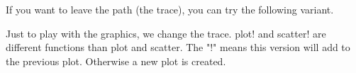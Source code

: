If you want to leave the path (the trace), you can try the following
variant.

\begin{Shaded}
\begin{Highlighting}[]
\NormalTok{scatter([x[}\NormalTok{]]}\OperatorTok{,}\NormalTok{[y[}\NormalTok{]]}\OperatorTok{,}\OperatorTok{=}\NormalTok{ (}\OperatorTok{,}\NormalTok{)}\OperatorTok{,}\OperatorTok{=}\NormalTok{ (}\OperatorTok{,}\NormalTok{)}\OperatorTok{,}\OperatorTok{=} \OperatorTok{:}\OperatorTok{,}\OperatorTok{=} \OperatorTok{,}\OperatorTok{=} \OperatorTok{:}
\OperatorTok{=} \OperatorTok{:}
\NormalTok{)}
\OperatorTok{=}\NormalTok{ x[}\OperatorTok{:}\NormalTok{i]}
\OperatorTok{=}\NormalTok{ y[}\OperatorTok{:}\NormalTok{i]}
\OperatorTok{=}\OperatorTok{,}\OperatorTok{,}\OperatorTok{=}\NormalTok{ (}\OperatorTok{,}\NormalTok{)}\OperatorTok{,}\OperatorTok{=}\NormalTok{ (}\OperatorTok{,}\NormalTok{)}\OperatorTok{,}\OperatorTok{=} \OperatorTok{:}\OperatorTok{,}\OperatorTok{=} \OperatorTok{,}\OperatorTok{=} \OperatorTok{:}
\NormalTok{)}
\end{Highlighting}
\end{Shaded}

Just to play with the graphics, we change the trace. plot! and scatter!
are different functions than plot and scatter. The "!" means this
version will add to the previous plot. Otherwise a new plot is created.

